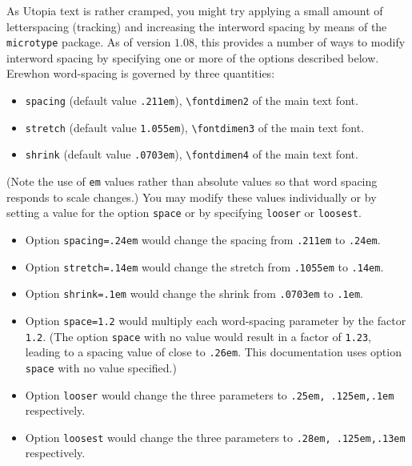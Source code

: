 \documentclass[11pt]{amsart}
\begin{document}
As Utopia text is rather cramped, you might try  applying a small amount of letterspacing (tracking) and increasing the interword spacing by means of the {\tt microtype} package. As of version $1.08$, this provides a number of ways to modify interword spacing by specifying one or more of the options described below. Erewhon  word-spacing is governed by three quantities: 
\begin{itemize}
\item
{\tt spacing} (default value {\tt .211em}), \verb|\fontdimen2| of the main text font.
\item
{\tt stretch} (default value {\tt 1.055em}), \verb|\fontdimen3| of the main text font.
\item
{\tt shrink} (default value {\tt .0703em}), \verb|\fontdimen4| of the main text font.
\end{itemize}
(Note the use of {\tt em} values rather than absolute values so that word spacing responds to scale changes.) You may  modify these values individually or by setting a value for the option {\tt space} or by specifying {\tt looser} or {\tt loosest}.
\begin{itemize}
\item
Option {\tt spacing=.24em} would change the spacing from {\tt.211em} to {\tt.24em}.
\item
Option {\tt stretch=.14em} would change the stretch from {\tt.1055em} to {\tt.14em}.
\item
Option {\tt shrink=.1em} would change the shrink from {\tt.0703em} to {\tt.1em}.
\item
Option {\tt space=1.2} would multiply each word-spacing parameter by the factor {\tt1.2}. (The option {\tt space} with no value would result in a factor of {\tt 1.23}, leading to a spacing value of close to {\tt.26em}. This documentation uses option {\tt space} with no value specified.)
\item
Option {\tt looser} would change the three parameters to {\tt.25em, .125em,.1em} respectively. 
\item
Option {\tt loosest} would change the three parameters to {\tt.28em, .125em,.13em} respectively. 
\end{itemize}
\end{document}
